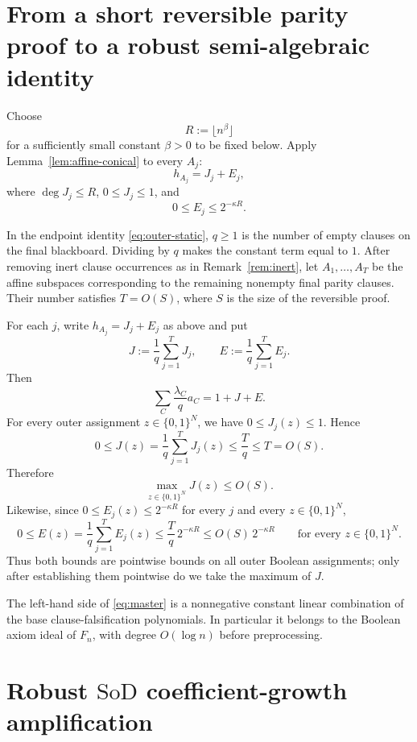 \documentclass[11pt]{article}
\theoremstyle{definition}
\newcommand{\SoD}{\mathrm{SoD}}
\begin{document}
\section{From a short reversible parity proof to a robust semi-algebraic identity}\label{sec:short-to-robust}

Choose
\[
  R:=\lfloor n^\beta\rfloor
  \tag{5.1}\label{eq:R}
\]
for a sufficiently small constant $\beta>0$ to be fixed below.
Apply Lemma~\ref{lem:affine-conical} to every $A_j$:
\[
  h_{A_j}=J_j+E_j,
\]
where $\deg J_j\le R$, $0\le J_j\le1$, and
\[
  0\le E_j\le2^{-\kappa R}.
\]

\label{sec:overview-step4-detail}
In the endpoint identity \eqref{eq:outer-static}, $q\ge1$ is the number of empty
clauses on the final blackboard.  Dividing by $q$ makes the constant term equal to $1$.
After removing inert clause occurrences as in Remark~\ref{rem:inert}, let
$A_1,\ldots,A_T$ be the affine subspaces corresponding to the remaining nonempty final
parity clauses.  Their number satisfies $T=O(S)$, where $S$ is the size of the
reversible proof.

For each $j$, write $h_{A_j}=J_j+E_j$ as above and put
\[
  J:=\frac1q\sum_{j=1}^TJ_j,
  \qquad
  E:=\frac1q\sum_{j=1}^TE_j.
\]
Then
\[
  \sum_C\frac{\lambda_C}{q}a_C
  =
  1+J+E.
  \tag{5.2}\label{eq:master}
\]
For every outer assignment $z\in\{0,1\}^N$, we have $0\le J_j(z)\le1$.  Hence
\[
  0\le J(z)
  =\frac1q\sum_{j=1}^T J_j(z)
  \le\frac Tq
  \le T
  =O(S).
  \tag{5.3}\label{eq:Jbound}
\]
Therefore
\[
  \max_{z\in\{0,1\}^N}J(z)\le O(S).
\]
Likewise, since $0\le E_j(z)\le2^{-\kappa R}$ for every $j$ and every
$z\in\{0,1\}^N$,
\[
  0\le E(z)
  =\frac1q\sum_{j=1}^T E_j(z)
  \le\frac Tq\,2^{-\kappa R}
  \le O(S)\,2^{-\kappa R}
  \qquad\text{for every }z\in\{0,1\}^N.
  \tag{5.4}\label{eq:Ebound}
\]
Thus both bounds are pointwise bounds on all outer Boolean assignments; only after
establishing them pointwise do we take the maximum of $J$.

The left-hand side of \eqref{eq:master} is a nonnegative constant linear combination
of the base clause-falsification polynomials.  In particular it belongs to the
Boolean axiom ideal of $F_n$, with degree $O(\log n)$ before preprocessing.

\section{Robust $\SoD$ coefficient-growth amplification}\label{sec:base-lb}
\end{document}
